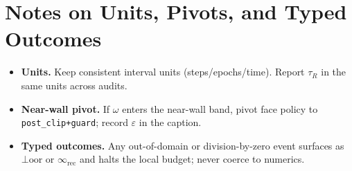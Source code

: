 \section{Notes on Units, Pivots, and Typed Outcomes}
\begin{itemize}[leftmargin=1.25em]
  \item \textbf{Units.} Keep consistent interval units (steps/epochs/time). Report \(\tau_R\) in the same units across audits.
  \item \textbf{Near-wall pivot.} If \(\omega\) enters the near-wall band, pivot face policy to \texttt{post\_clip+guard}; record \(\varepsilon\) in the caption.
  \item \textbf{Typed outcomes.} Any out-of-domain or division-by-zero event surfaces as \(\bot\!\mathrm{oor}\) or \(\infty_{\mathrm{rec}}\) and halts the local budget; never coerce to numerics.
\end{itemize}

